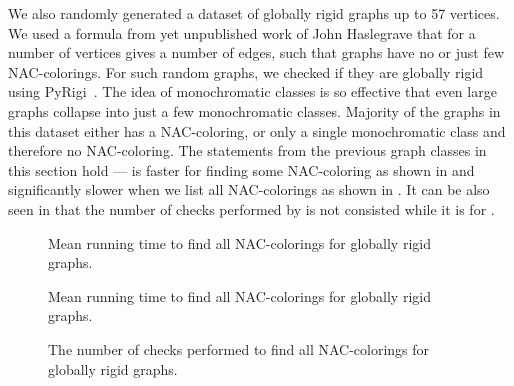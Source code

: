 We also randomly generated a dataset of globally rigid graphs
up to 57 vertices.
We used a formula from yet unpublished work of John Haslegrave
that for a number of vertices gives a number of edges,
such that graphs have no or just few NAC-colorings.
For such random graphs, we checked if they are globally rigid using PyRigi~\cite{pyrigi}.
%
The idea of monochromatic classes is so effective
that even large graphs collapse into just a few monochromatic classes.
Majority of the graphs in this dataset either has a NAC-coloring,
or only a single monochromatic class and therefore no NAC-coloring.
%
The statements from the previous graph classes in this section hold
--- \NaiveCycles{} is faster for finding some NAC-coloring
as shown in 
and significantly slower when we list all NAC-colorings
as shown in .
It can be also seen in 
that the number of checks performed
by \NaiveCycles{} is not consisted while it is for \Subgraphs{}.

\begin{figure}[p]
	\centering
	\scalebox{0.5}{}
	\caption[Mean runtime for globally rigid graphs (some).]{
		Mean running time to find all NAC-colorings for globally rigid graphs.}%
	\label{fig:graph_globally_rigid_first_runtime}
\end{figure}%
\begin{figure}[p]
	\centering
	\scalebox{0.5}{}
	\caption[Mean runtime for globally rigid graphs (all).]{
		Mean running time to find all NAC-colorings for globally rigid graphs.}%
	\label{fig:graph_globally_rigid_all_runtime}
\end{figure}%
\begin{figure}[p]
	\centering
	\scalebox{0.5}{}
	\caption[Checks performed for globally rigid graphs (all).]{
		The number of checks performed to find all NAC-colorings for globally rigid graphs.}%
	\label{fig:graph_globally_rigid_all_checks}
\end{figure}%


